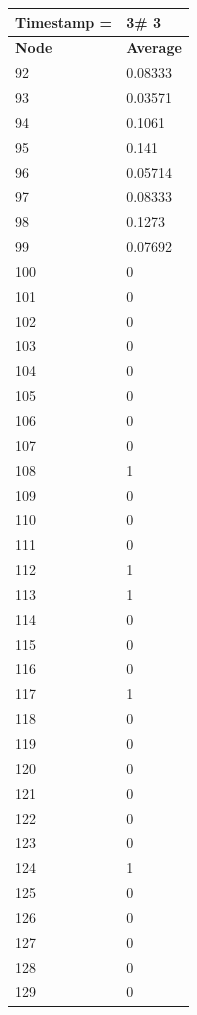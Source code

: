 \begin{tabular}{|l||l|}
\hline
\textbf{Timestamp =} & \textbf{3}\# 3\\\hline
	\textbf{Node} & \textbf{Average} \\ \hline
\hline
	92 & 0.08333 \\ \hline
	93 & 0.03571 \\ \hline
	94 & 0.1061 \\ \hline
	95 & 0.141 \\ \hline
	96 & 0.05714 \\ \hline
	97 & 0.08333 \\ \hline
	98 & 0.1273 \\ \hline
	99 & 0.07692 \\ \hline
	100 & 0 \\ \hline
	101 & 0 \\ \hline
	102 & 0 \\ \hline
	103 & 0 \\ \hline
	104 & 0 \\ \hline
	105 & 0 \\ \hline
	106 & 0 \\ \hline
	107 & 0 \\ \hline
	108 & 1 \\ \hline
	109 & 0 \\ \hline
	110 & 0 \\ \hline
	111 & 0 \\ \hline
	112 & 1 \\ \hline
	113 & 1 \\ \hline
	114 & 0 \\ \hline
	115 & 0 \\ \hline
	116 & 0 \\ \hline
	117 & 1 \\ \hline
	118 & 0 \\ \hline
	119 & 0 \\ \hline
	120 & 0 \\ \hline
	121 & 0 \\ \hline
	122 & 0 \\ \hline
	123 & 0 \\ \hline
	124 & 1 \\ \hline
	125 & 0 \\ \hline
	126 & 0 \\ \hline
	127 & 0 \\ \hline
	128 & 0 \\ \hline
	129 & 0 \\ \hline
\end{tabular}

